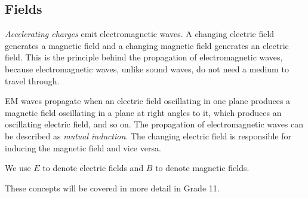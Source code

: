             \subsection*{Fields}
            \nopagebreak
      \label{m38777*id187125}\textit{Accelerating charges} emit electromagnetic waves. A changing electric field generates a magnetic field and a changing magnetic field generates an electric field. This is the principle behind the propagation of electromagnetic waves, because electromagnetic waves, unlike sound waves, do not need a medium to travel through. 

EM waves propagate when an electric field oscillating in one plane produces a magnetic field oscillating in a plane at right angles to it, which produces an oscillating electric field, and so on. The propagation of electromagnetic waves can be described as \textsl{mutual induction}. The changing electric field is responsible for inducing the magnetic field and vice versa.\par We use $E$ to denote electric fields and $B$ to denote magnetic fields.\par
These concepts will be covered in more detail in Grade 11.

